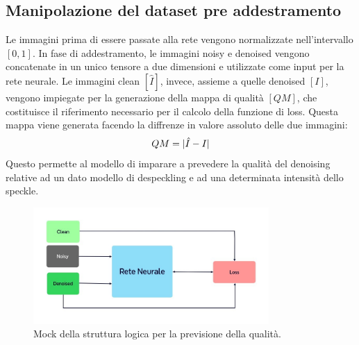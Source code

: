 \subsection{Manipolazione del dataset pre addestramento}
Le immagini prima di essere passate alla rete vengono normalizzate nell'intervallo $[0,1]$.
In fase di addestramento, le immagini noisy e denoised vengono concatenate in un unico tensore a due dimensioni e utilizzate come 
input per la rete neurale. Le immagini clean $[\hat{I}]$, invece, assieme a quelle denoised $[I]$, vengono impiegate per la 
generazione della mappa di qualità $[QM]$, che costituisce il riferimento necessario per 
il calcolo della funzione di loss. Questa mappa viene generata facendo la diffrenze in valore assoluto delle due immagini:
\begin{equation}
  \makebox[\textwidth][c]{%
    $\displaystyle
      QM = |\hat{I} - I |
    $%
  }
\end{equation}
Questo permette al modello di imparare a 
prevedere la qualità del denoising relative ad un dato modello di despeckling e ad una determinata intensità dello speckle. 
\begin{figure}[H]
    \centering
    \includegraphics[width=0.8\textwidth]{utils/Architettura_rete_neurale.jpg}
    \caption{Mock della struttura logica per la previsione della qualità.}
    \label{fig:MockReteNeurale}
\end{figure}

